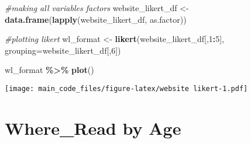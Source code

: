 \documentclass[
]{article}
\newenvironment{Shaded}{\begin{snugshade}}{\end{snugshade}}
\newcommand{\AttributeTok}[1]{\textcolor[rgb]{0.13,0.29,0.53}{#1}}
\newcommand{\CommentTok}[1]{\textcolor[rgb]{0.56,0.35,0.01}{\textit{#1}}}
\newcommand{\DecValTok}[1]{\textcolor[rgb]{0.00,0.00,0.81}{#1}}
\newcommand{\FunctionTok}[1]{\textcolor[rgb]{0.13,0.29,0.53}{\textbf{#1}}}
\newcommand{\NormalTok}[1]{#1}
\newcommand{\OtherTok}[1]{\textcolor[rgb]{0.56,0.35,0.01}{#1}}
\newcommand{\SpecialCharTok}[1]{\textcolor[rgb]{0.81,0.36,0.00}{\textbf{#1}}}
\begin{document}
\begin{Shaded}
\begin{Highlighting}[]
\CommentTok{\#making all variables factors}
\NormalTok{website\_likert\_df }\OtherTok{\textless{}{-}} \FunctionTok{data.frame}\NormalTok{(}\FunctionTok{lapply}\NormalTok{(website\_likert\_df, as.factor))}

\CommentTok{\#plotting likert }
\NormalTok{wl\_format }\OtherTok{\textless{}{-}} \FunctionTok{likert}\NormalTok{(website\_likert\_df[,}\DecValTok{1}\SpecialCharTok{:}\DecValTok{5}\NormalTok{], }\AttributeTok{grouping=}\NormalTok{website\_likert\_df[,}\DecValTok{6}\NormalTok{])}

\NormalTok{wl\_format }\SpecialCharTok{\%\textgreater{}\%} \FunctionTok{plot}\NormalTok{()}
\end{Highlighting}
\end{Shaded}

\texttt{[image: main\_code\_files/figure-latex/website likert-1.pdf]}

\hypertarget{where_read-by-age}{%
\section{Where\_Read by Age}\label{where_read-by-age}}
\end{document}
